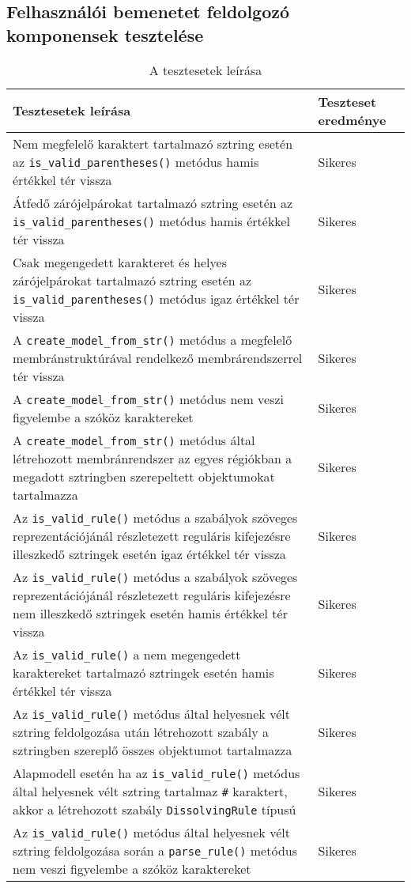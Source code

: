 \subsection{Felhasználói bemenetet feldolgozó komponensek tesztelése}
\begin{table}[H]
	\centering
	\begin{tabular}{ | m{} | m{} | }
		\hline
		\textbf{Tesztesetek leírása} & \textbf{Teszteset eredménye} \\
		\hline \hline
		Nem megfelelő karaktert tartalmazó sztring esetén az \verb|is_valid_parentheses()| metódus hamis értékkel tér vissza & Sikeres \\
		\hline
		Átfedő zárójelpárokat tartalmazó sztring esetén az \verb|is_valid_parentheses()| metódus hamis értékkel tér vissza & Sikeres \\
		\hline
	Csak megengedett karakteret és helyes zárójelpárokat tartalmazó sztring esetén az \verb|is_valid_parentheses()| metódus igaz értékkel tér vissza & Sikeres \\
		\hline
		A   \verb|create_model_from_str()| metódus a megfelelő membránstruktúrával rendelkező membrárendszerrel tér vissza & Sikeres \\
				A   \verb|create_model_from_str()| metódus nem veszi figyelembe a szóköz karaktereket & Sikeres \\
		\hline
		A   \verb|create_model_from_str()| metódus által létrehozott membránrendszer az egyes régiókban a megadott sztringben szerepeltett objektumokat tartalmazza & Sikeres \\
		\hline
		Az   \verb|is_valid_rule()| metódus a szabályok szöveges reprezentációjánál részletezett reguláris kifejezésre illeszkedő sztringek esetén igaz értékkel tér vissza & Sikeres \\
		\hline
		Az   \verb|is_valid_rule()| metódus a szabályok szöveges reprezentációjánál részletezett reguláris kifejezésre nem illeszkedő sztringek esetén hamis értékkel tér vissza & Sikeres \\
		\hline
		Az   \verb|is_valid_rule()| a nem megengedett karaktereket tartalmazó sztringek esetén hamis értékkel tér vissza & Sikeres \\
		\hline
		
		Az \verb|is_valid_rule()| metódus által helyesnek vélt sztring feldolgozása után létrehozott szabály a sztringben szereplő összes objektumot tartalmazza & Sikeres \\
		\hline
				Alapmodell esetén ha az \verb|is_valid_rule()| metódus által helyesnek vélt sztring tartalmaz \verb|#| karaktert, akkor a  létrehozott szabály \verb|DissolvingRule| típusú & Sikeres \\
		\hline
		Az \verb|is_valid_rule()| metódus által helyesnek vélt sztring feldolgozása során a \verb|parse_rule()| metódus nem veszi figyelembe a szóköz karaktereket & Sikeres \\
		\hline

	\end{tabular}
	\caption{A tesztesetek leírása}
	\label{tab:test_cases_parse}
\end{table}

